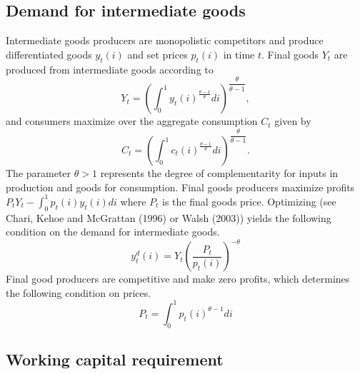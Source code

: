 \documentclass{article}
\begin{document}
\subsection{Demand for intermediate goods}

Intermediate goods producers are monopolistic competitors and produce
differentiated goods $y_{t}\left( i\right)$ and set prices $p_{t}\left(
i\right)$ in time $t$. Final goods $Y_{t}$ are produced from intermediate
goods according to
\begin{equation*}
Y_{t}=\left( \int_{0}^{1}y_{t}\left( i\right) ^{\frac{\theta -1}{\theta }%
}di\right) ^{\dfrac{\theta }{\theta -1}},
\end{equation*}
and consumers maximize over the aggregate consumption $C_{t}$ given by
\begin{equation*}
C_{t}=\left( \int_{0}^{1}c_{t}\left( i\right) ^{\frac{\theta -1}{\theta }%
}di\right) ^{\dfrac{\theta }{\theta -1}}.
\end{equation*}
The parameter $\theta >1$ represents the degree of complementarity for
inputs in production and goods for consumption. Final goods producers
maximize profits $P_{t}Y_{t}-\int_{0}^{1}p_{t}\left( i\right) y_{t}\left(
i\right) di$ where $P_{t}$ is the final goods price. Optimizing (see
Chari, Kehoe and McGrattan (1996) or Walsh (2003)) yields the following
condition on the demand for intermediate goods.
\begin{equation}
y_{t}^{d}\left( i\right) =Y_{t}\left( \frac{P_{t}}{p_{t}\left( i\right) }%
\right) ^{-\theta }  \label{demand}
\end{equation}
Final good producers are competitive and make zero profits, which determines
the following condition on prices.
\begin{equation*}
P_{t}=\int_{0}^{1}p_{t}\left( i\right) ^{\theta -1}di
\end{equation*}

\subsection{Working capital requirement}
\end{document}
